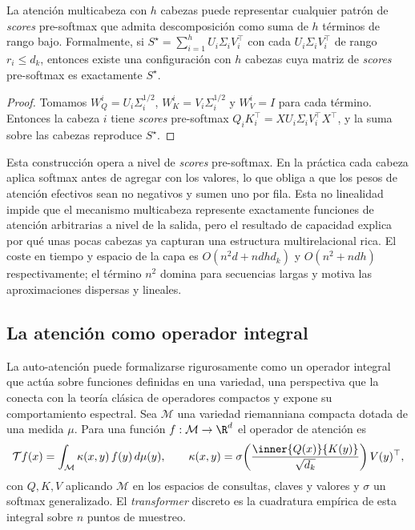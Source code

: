 \begin{proposition}
\label{prop:apps:multihead-capacity}
La atenci\'on multicabeza con $h$ cabezas puede representar cualquier patr\'on de
\emph{scores} pre-softmax que admita descomposici\'on como suma de $h$ t\'erminos
de rango bajo. Formalmente, si $S^\star = \sum_{i=1}^h U_i\Sigma_i V_i^\top$ con
cada $U_i\Sigma_i V_i^\top$ de rango $r_i\le d_k$, entonces existe una
configuraci\'on con $h$ cabezas cuya matriz de \emph{scores} pre-softmax es
exactamente $S^\star$.
\end{proposition}

\begin{proof}
Tomamos $W_Q^i = U_i\Sigma_i^{1/2}$, $W_K^i = V_i\Sigma_i^{1/2}$ y $W_V^i = I$
para cada t\'ermino. Entonces la cabeza $i$ tiene \emph{scores} pre-softmax
$Q_i K_i^\top = X U_i\Sigma_i V_i^\top X^\top$, y la suma sobre las cabezas
reproduce $S^\star$.
\end{proof}

\begin{remark}
\label{rem:apps:multihead-nonlinearity}
Esta construcci\'on opera a nivel de \emph{scores} pre-softmax. En la pr\'actica
cada cabeza aplica softmax antes de agregar con los valores, lo que obliga a que
los pesos de atenci\'on efectivos sean no negativos y sumen uno por fila. Esta no
linealidad impide que el mecanismo multicabeza represente exactamente funciones
de atenci\'on arbitrarias a nivel de la salida, pero el resultado de capacidad
explica por qu\'e unas pocas cabezas ya capturan una estructura multirelacional
rica. El coste en tiempo y espacio de la capa es $O(n^2 d + n d h d_k)$ y
$O(n^2 + ndh)$ respectivamente; el t\'ermino $n^2$ domina para secuencias largas
y motiva las aproximaciones dispersas y lineales.
\end{remark}

\subsection{La atenci\'on como operador integral}
\label{subsec:apps:integral-operator}

La auto-atenci\'on puede formalizarse rigurosamente como un operador integral que
act\'ua sobre funciones definidas en una variedad, una perspectiva que la conecta
con la teor\'ia cl\'asica de operadores compactos y expone su comportamiento
espectral. Sea $\mathcal{M}$ una variedad riemanniana compacta dotada de una
medida $\mu$. Para una funci\'on $f:\mathcal{M}\to\R^d$ el operador de atenci\'on
es
\[
  \mathcal{T}f(x) = \int_{\mathcal{M}} \kappa(x,y)\, f(y)\, d\mu(y),
  \qquad
  \kappa(x,y) = \sigma\!\left(\frac{\inner{Q(x)}{K(y)}}{\sqrt{d_k}}\right) V(y)^\top,
\]
con $Q,K,V$ aplicando $\mathcal{M}$ en los espacios de consultas, claves y
valores y $\sigma$ un softmax generalizado. El \emph{transformer} discreto es la
cuadratura emp\'irica de esta integral sobre $n$ puntos de muestreo.

